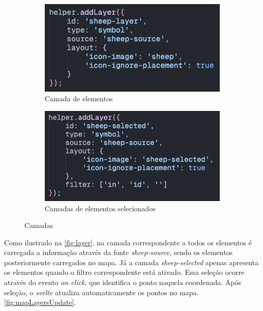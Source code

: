 \begin{figure}[!h]
	\centering
	\begin{subfigure}[c]{0.40\textwidth}
		\centering
		\includegraphics[width=\textwidth]{figs/layer.png}
		\caption{Camada de elementos}
		\label{fig:layer}
	\end{subfigure}
	\hfill
	\begin{subfigure}[c]{0.40\textwidth}
		\centering
		\includegraphics[width=\textwidth]{figs/selected_layer.png}
		\caption{Camadas de elementos selecionados}
		\label{fig:selected_layer}
	\end{subfigure}
	\caption{Camadas}
    \label{fig:layers}
\end{figure}

Como ilustrado na \autoref{fig:layer}, na camada correspondente a todos os elementos é carregada a informação através da fonte \textit{sheep-source}, sendo os elementos posteriormente carregados no mapa. Já a camada \textit{sheep-selected} apenas apresenta os elementos quando o filtro correspondente está ativado. Essa seleção ocorre através do evento \textit{on click}, que identifica o ponto naquela coordenada. Após seleção, o \textit{svelte} atualiza automaticamente os pontos no mapa. \autoref{fig:mapLayersUpdate}.

